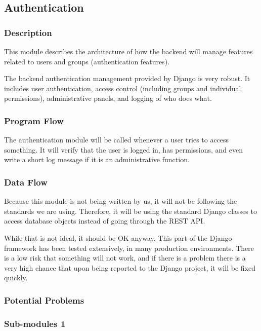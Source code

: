 
\subsection{Authentication}

\subsubsection{Description}

This module describes the architecture of how the backend will manage features related to users and groups (authentication features).

The backend authentication management provided by Django is very robust. It includes user authentication, access control (including groups and individual permissions), administrative panels, and logging of who does what. 

\subsubsection{Program Flow}

The authentication module will be called whenever a user tries to access something. It will verify that the user is logged in, has permissions, and even write a short log message if it is an administrative function.

\subsubsection{Data Flow}

Because this module is not being written by us, it will not be following the standards we are using. Therefore, it will be using the standard Django classes to access database objects instead of going through the REST API. 

While that is not ideal, it should be OK anyway. This part of the Django framework has been tested extensively, in many production environments. There is a low risk that something will not work, and if there is a problem there is a very high chance that upon being reported to the Django project, it will be fixed quickly.

\subsubsection{Potential Problems}


\subsubsection{Sub-modules 1}

